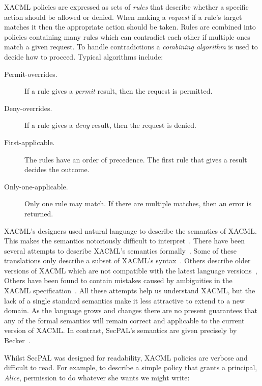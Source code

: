 \documentclass[thesis.tex]{subfiles}
\begin{document}
XACML policies are expressed as sets of \emph{rules} that describe whether a
specific action should be allowed or denied. When making a \emph{request} if a
rule's target matches it then the appropriate action should be taken. Rules are
combined into policies containing many rules which can contradict each other if
multiple ones match a given request. To handle contradictions a \emph{combining
algorithm} is used to decide how to proceed. Typical algorithms include:

\begin{description}
  \item[Permit-overrides.] If a rule gives a \emph{permit} result, then the request is permitted.
  \item[Deny-overrides.] If a rule gives a \emph{deny} result, then the request is denied.
  \item[First-applicable.] The rules have an order of precedence. The first rule that gives a result decides the outcome.
  \item[Only-one-applicable.] Only one rule may match. If there are multiple matches, then an error is returned.
\end{description}

XACML's designers used natural language to describe the semantics of XACML. This
makes the semantics notoriously difficult to
interpret~\cite{ramli_detecting_2015}. There have been several attempts to
describe XACML's semantics
formally~\cite{ramli_xacml_2012,ramli_logic_2014,bryans_reasoning_2005}. Some of
these translations only describe a subset of XACML's
syntax~\cite{halpern_using_2008}. Others describe older versions of XACML which
are not compatible with the latest language versions~\cite{ahn_reasoning_2010},
Others have been found to contain mistakes caused by ambiguities in the
XACML specification~\cite{bruns_access-control_2008,halpern_using_2008}. All
these attempts help us understand XACML, but the lack of a single standard
semantics make it less attractive to extend to a new domain. As the language
grows and changes there are no present guarantees that any of the formal
semantics will remain correct and applicable to the current version of XACML. In
contrast, SecPAL's semantics are given precisely by
Becker~\cite{becker_secpal:_2006}.

Whilst SecPAL was designed for readability, XACML policies are verbose and
difficult to read. For example, to describe a simple policy that grants a principal,
\emph{Alice}, permission to do whatever she wants we might write:
\end{document}
